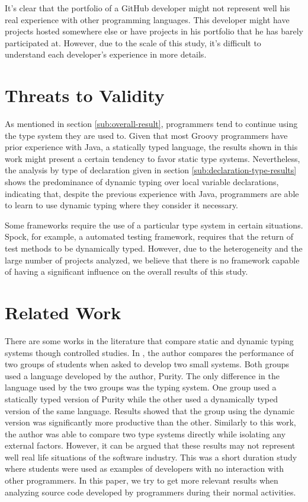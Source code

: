 \documentclass[preprint]{sigplanconf}
\begin{document}
It's clear that the portfolio of a GitHub developer might not represent well his real experience with other programming languages.
This developer might have projects hosted somewhere else or have projects in his portfolio that he has barely participated at.
However, due to the scale of this study, it's difficult to understand each developer's experience in more details.











%
%
\section{Threats to Validity\label{sec:ameaca}}
As mentioned in section \ref{sub:overall-result}, programmers tend to continue using the type system they are used to.
Given that most Groovy programmers have prior experience with Java, a statically typed language, the results shown in this work might present a certain tendency to favor static type systems. 
Nevertheless, the analysis by type of declaration given in section \ref{sub:declaration-type-results} shows the predominance of dynamic typing over local variable declarations, indicating that, despite the previous experience with Java,
programmers are able to learn to use dynamic typing where they consider it necessary.

Some frameworks require the use of a particular type system in certain situations. 
Spock, for example, a automated testing framework, requires that the return of test methods to be dynamically typed. 
However, due to the heterogeneity and the large number of projects analyzed, we believe that there is no framework capable of having a significant influence on the overall results of this study.

\section{Related Work\label{sec:Trabalhos-Relacionados}}
There are some works in the literature that compare static and dynamic typing systems though controlled studies.
In \cite{experiment_with_purity}, the author compares the performance of two groups of students when asked to develop two small systems. 
Both groups used a language developed by the author, Purity. 
The only difference in the language used by the two groups was the typing system.
One group used a statically typed version of Purity while the other used a dynamically typed version of the same language.
Results showed that the group using the dynamic version was significantly more productive than the other. 
Similarly to this work, the author was able to compare two type systems directly while isolating any external factors. 
However, it can be argued that these results may not represent well real life situations of the software industry. 
This was a short duration study where students were used as examples of developers with no interaction with other programmers. 
In this paper, we try to get more relevant results when analyzing source code developed by programmers during their normal activities.
\end{document}
